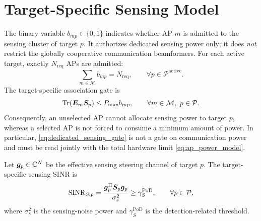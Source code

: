 \section{Target-Specific Sensing Model}\label{sec:sensing_model}

The binary variable $b_{mp}\in\{0,1\}$ indicates whether AP $m$ is admitted
to the sensing cluster of target $p$.  It authorizes dedicated sensing power
only; it does \emph{not} restrict the globally cooperative communication
beamformers.  For each active target, exactly $N_{\mathrm{req}}$ APs are
admitted:
\begin{equation}\label{eq:cluster_cardinality_model}
    \sum_{m\in\mathcal{M}}b_{mp}=N_{\mathrm{req}},\qquad
    \forall p\in\mathcal{P}^{\mathrm{active}}.
\end{equation}
The target-specific association gate is
\begin{equation}\label{eq:dedicated_sensing_gate}
    \operatorname{Tr}(\bm{E}_m\bm{S}_p)\leq P_{\max}b_{mp},
    \qquad\forall m\in\mathcal{M},\ p\in\mathcal{P}.
\end{equation}
Consequently, an unselected AP cannot allocate sensing power to target $p$,
whereas a selected AP is not forced to consume a minimum amount of power.  In
particular, \eqref{eq:dedicated_sensing_gate} is not a gate on communication
power and must be read jointly with the total hardware limit
\eqref{eq:ap_power_model}.

Let $\bm{g}_p\in\mathbb{C}^{N}$ be the effective sensing steering channel
of target $p$.  The target-specific sensing SINR is
\begin{equation}\label{eq:sensing_sinr_model}
    \mathrm{SINR}_{S,p}=
    \frac{\bm{g}_p^{\mathrm{H}}\bm{S}_p\bm{g}_p}{\sigma_s^2}
    \geq\gamma_S^{\mathrm{PoD}},\qquad \forall p\in\mathcal{P},
\end{equation}
where $\sigma_s^2$ is the sensing-noise power and
$\gamma_S^{\mathrm{PoD}}$ is the detection-related threshold.

